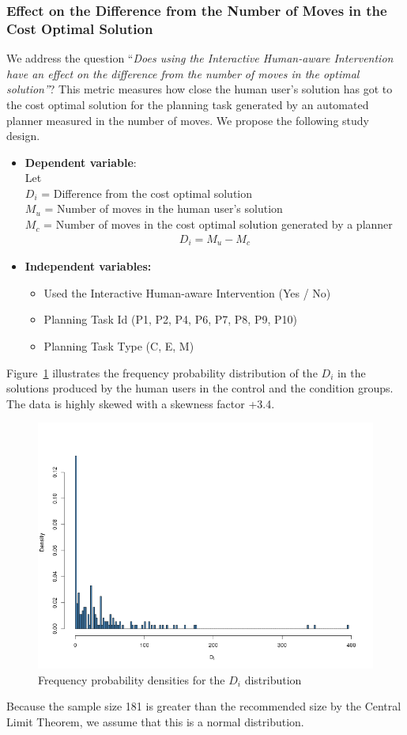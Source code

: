 \subsubsection{Effect on the Difference from the Number of Moves in the Cost Optimal Solution}
We address the question ``\textit{Does using the Interactive Human-aware Intervention have an effect on the difference from the number of moves in the optimal solution''}?
This metric measures how close the human user's solution has got to the cost optimal solution for the planning task generated by an automated planner measured in the number of moves.
We propose the following study design.
\begin{itemize}
\item \textbf{Dependent variable}: \\
Let\\
 $D_i$ = \textup{Difference from the cost optimal solution}\\
 $M_u$ = \textup{Number of moves in the human user's solution}\\
 $M_c$ = \textup{Number of moves in the cost optimal solution generated by a planner}
 \begin{align}
	D_i = M_u - M_c
 \end{align}
\item \textbf{Independent variables:}
\begin{itemize}
\item Used the Interactive Human-aware Intervention (Yes / No)
\item Planning Task Id (P1, P2, P4, P6, P7, P8, P9, P10)
\item Planning Task Type (C, E, M)
\end{itemize}
\end{itemize}

Figure~\ref{fig:lenopthisto} illustrates the frequency probability distribution of the $D_i$ in the solutions produced by the human users in the control and the condition groups. 
The data is highly skewed with a skewness factor +3.4.
\begin{figure}[tpb]
  \centering
\includegraphics[width=0.8\columnwidth]{img/histo_lenopt.png}
  \caption{Frequency probability densities for the $D_i$ distribution}
  \label{fig:lenopthisto}
\end{figure}
Because the sample size 181 is greater than the recommended size by the Central Limit Theorem, we assume that this is a normal distribution.

